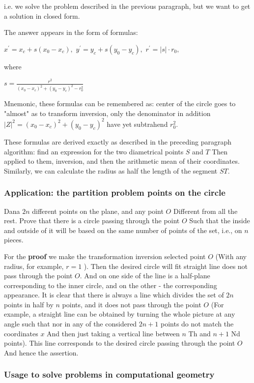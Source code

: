 i.e. we solve the problem described in the previous paragraph, but we want to get a solution in closed form.

The answer appears in the form of formulas:

$x ^ \prime = x_c + s (x_0 - x_c),$
$y ^ \prime = y_c + s (y_0 - y_c),$
$r ^ \prime = | s | \cdot r_0,$

where

$s=\frac{r^{2}}{(x_{0}-x_{c})^{2}+(y_{0}-y_{c})^{2}-r_{0}^{2}}$

Mnemonic, these formulas can be remembered as: center of the circle goes to "almost" as to transform inversion, only the denominator in addition $| Z | ^ 2 = (x_0 - x_c) ^ 2 + (y_0 - y_c) ^ 2$ have yet subtrahend $r_0 ^ 2$.

These formulas are derived exactly as described in the preceding paragraph algorithm: find an expression for the two diametrical points $S$ and $T$ Then applied to them, inversion, and then the arithmetic mean of their coordinates. Similarly, we can calculate the radius as half the length of the segment $ST$.

\subsubsection{ Application: the partition problem points on the circle }

Dana $2n$ different points on the plane, and any point $O$ Different from all the rest. Prove that there is a circle passing through the point $O$ Such that the inside and outside of it will be based on the same number of points of the set, i.e., on $n$ pieces.

For the \textbf{proof} we make the transformation inversion selected point $O$ (With any radius, for example, $r = 1$ ). Then the desired circle will fit straight line does not pass through the point $O$. And on one side of the line is a half-plane corresponding to the inner circle, and on the other - the corresponding appearance. It is clear that there is always a line which divides the set of $2n$ points in half by $n$ points, and it does not pass through the point $O$ (For example, a straight line can be obtained by turning the whole picture at any angle such that nor in any of the considered $2n +1$ points do not match the coordinates $x$ And then just taking a vertical line between $n$ Th and $n +1$ Nd points). This line corresponds to the desired circle passing through the point $O$ And hence the assertion.

\subsubsection{ Usage to solve problems in computational geometry }

